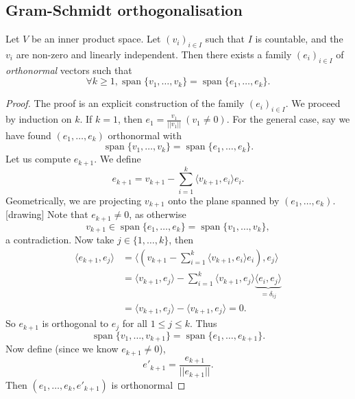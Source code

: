 \documentclass[a4paper]{scrartcl}
\begin{document}
\subsection{Gram-Schmidt orthogonalisation}
\begin{theorem}
      Let $V$ be an inner product space. Let $\left(v_i\right)_{i \in I}$ such that $I$ is countable, and the $v_i$ are non-zero and linearly independent. Then there exists a family $\left(e_i\right)_{i \in I}$ of \emph{orthonormal} vectors such that 
      \[\forall k \geq 1, \operatorname{span} \{v_1,\ldots ,v_k\}=\operatorname{span} \{e_1,\ldots ,e_k\}.\]
\end{theorem}

\begin{proof}
      The proof is an explicit construction of the family $\left(e_i\right)_{i \in I}$. We proceed by induction on $k$.\newline 
      If $k=1$, then $e_1=\frac{v_1}{||v_1||} \ \left(v_1 \neq 0\right)$. For the general case, say we have found $\left(e_1, \ldots ,e_k\right)$ orthonormal with 
      \[\operatorname{span} \{v_1,\ldots ,v_k\}=\operatorname{span} \{e_1,\ldots ,e_k\}.\]
      Let us compute $e_{k+1}$. We define 
      \[e_{k+1}=v_{k+1}-\sum_{i=1}^{k}\langle v_{k+1},e_i \rangle e_i .\]
      Geometrically, we are projecting $v_{k+1}$ onto the plane spanned by $\left(e_1, \ldots , e_k\right)$.[drawing] Note that $e_{k+1} \neq 0$, as otherwise 
      \[v_{k+1} \in \operatorname{span} \{e_1,\ldots ,e_k\}=\operatorname{span} \{v_1,\ldots ,v_k\},\]
      a contradiction. Now take $j \in \{1,\ldots ,k\}$, then 
      \begin{equation*}
          \begin{split}
               \langle e_{k+1},e_j \rangle&=\langle \left(v_{k+1}-\sum_{i=1}^{k}\langle v_{k+1},e_i \rangle e_i\right) ,e_j \rangle \\
               &=\langle v_{k+1},e_j \rangle - \sum_{i=1}^{k}\langle v_{k+1},e_j \rangle \underbrace{\langle e_i,e_j \rangle}_{=\delta_{ij}}\\
               &=\langle v_{k+1},e_j \rangle-\langle v_{k+1},e_j \rangle=0.
          \end{split}
      \end{equation*}
      So $e_{k+1}$ is orthogonal to $e_j$ for all $1 \leq j \leq k$. Thus 
      \[\operatorname{span} \{v_1,\ldots ,v_{k+1}\}=\operatorname{span} \{e_1,\ldots ,e_{k+1}\}.\]
      Now define (since we know $e_{k+1} \neq 0$), 
      \[e'_{k+1}=\frac{e_{k+1}}{||e_{k+1}||}.\]
      Then $\left(e_1, \ldots ,e_k, e'_{k+1}\right)$ is orthonormal
\end{proof}
\end{document}
